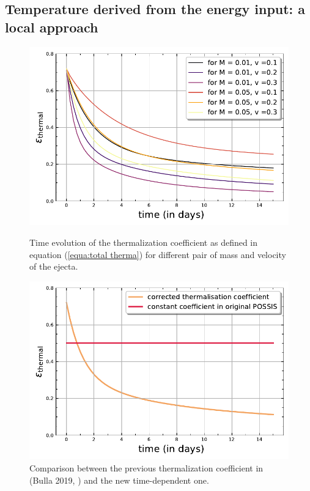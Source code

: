\documentclass[a4paper, twoside, 11pt]{article}
\numberwithin{equation}{section}
\begin{document}
 \subsection{Temperature derived from the energy input: a local approach}
 \label{subsec:tempLocal}
\begin{figure}[h!]
\begin{minipage}[h]{0.50\linewidth}
\includegraphics[scale=0.65]{pictures/plt_epsilon_thermal.pdf}
\caption[Thermalization coefficient for different ejecta properties]{Time evolution of the thermalization coefficient as defined in equation (\ref{equa:total therma}) for different pair of mass and velocity of the ejecta. }
\label{fig:differentEpsTherma}
\end{minipage}
\hspace{10 pt}
\begin{minipage}[h]{0.50\linewidth}
\includegraphics[scale=0.65]{pictures/eps_therma.pdf}
\caption[Thermalization coefficient comparison]{Comparison between the previous thermalization coefficient in (Bulla 2019, \cite{POSSIS_2019}) and the new time-dependent one.}
\label{fig:comparisonBeforeAfterEpsTherma}
\end{minipage}
\end{figure}
\end{document}
